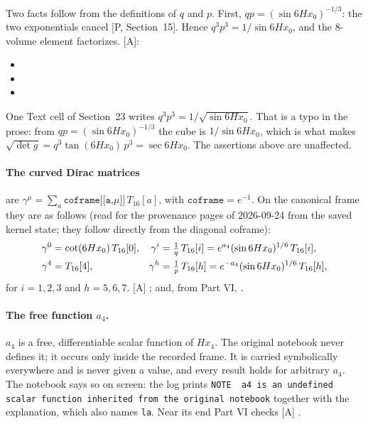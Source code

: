 Two facts follow from the definitions of $q$ and $p$. First, $qp=(\sin 6Hx_0)^{-1/3}$: the two
exponentials cancel [P, Section~15]. Hence $q^3p^3=1/\sin 6Hx_0$, and the 8-volume element
factorizes. [A]:
\begin{itemize}
  \item {}
  \item {}
  \item {}
\end{itemize}
One Text cell of Section~23 writes $q^3p^3=1/\sqrt{\sin 6Hx_0}$. That is a typo in the prose:
from $qp=(\sin 6Hx_0)^{-1/3}$ the cube is $1/\sin 6Hx_0$, which is what makes
$\sqrt{\det g}=q^3\tan(6Hx_0)\,p^3=\sec 6Hx_0$. The assertions above are unaffected.

\paragraph{The curved Dirac matrices} are
$\gamma^\mu=\sum_a \texttt{coframe[[a,}\mu\texttt{]]}\,T_{16}[a]$, with $\texttt{coframe}=e^{-1}$.
On the canonical frame they are as follows (read for the provenance pages of 2026-09-24 from the saved kernel
state; they follow directly from the diagonal coframe):
\begin{align}
  \gamma^0&=\cot(6Hx_0)\,T_{16}[0], &
  \gamma^i&=\tfrac1q\,T_{16}[i]=e^{a_4}(\sin 6Hx_0)^{1/6}\,T_{16}[i],\notag\\
  \gamma^4&=T_{16}[4], &
  \gamma^h&=\tfrac1p\,T_{16}[h]=e^{-a_4}(\sin 6Hx_0)^{1/6}\,T_{16}[h],
\end{align}
for $i=1,2,3$ and $h=5,6,7$. [A]
; and, from Part VI,
.

\paragraph{The free function $a_4$.} $a_4$ is a free, differentiable scalar function of $Hx_4$.
The original notebook never defines it; it occurs only inside the recorded frame. It is carried
symbolically everywhere and is never given a value, and every result holds for arbitrary $a_4$.
The notebook says so on screen: the log prints
\texttt{NOTE~~a4 is an undefined scalar function inherited from the original notebook} together
with the explanation, which also names \texttt{la}. Near its end Part VI checks [A]
.

